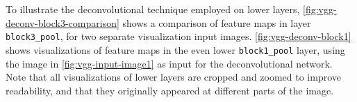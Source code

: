\noindent To illustrate the deconvolutional technique employed on lower layers, \autoref{fig:vgg-deconv-block3-comparison} shows a comparison of feature maps in layer \texttt{block3\_pool}, for two separate visualization input images. \autoref{fig:vgg-deconv-block1} shows visualizations of feature maps in the even lower \texttt{block1\_pool} layer, using the image in \autoref{fig:vgg-input-image1} as input for the deconvolutional network. Note that all visualizations of lower layers are cropped and zoomed to improve readability, and that they originally appeared at different parts of the image. 

\begin{figure}
\captionsetup[subfigure]{labelformat=empty}
\begin{center}



\end{center}
\end{figure}
